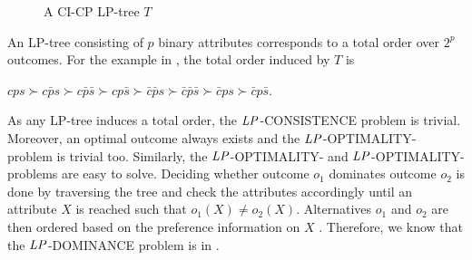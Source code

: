 \begin{figure}
   \small
	\centering

  
  \caption{A CI-CP LP-tree $T$}
  \label{fig:LPTree}
\end{figure}

An LP-tree consisting of $p$ binary attributes corresponds to a total order over
$2^p$ outcomes.  For the example in , the total order induced
by $T$ is
\begin{center}
	$cps \succ c\bar{p}s \succ c\bar{p}\bar{s} \succ cp\bar{s} 
		\succ \bar{c}\bar{p}s \succ \bar{c}\bar{p}\bar{s} \succ \bar{c}ps \succ \bar{c}p\bar{s}$.
\end{center}

As any LP-tree induces a total order, the $\mathit{LP}$-CONSISTENCE problem is trivial.
Moreover, an optimal outcome always exists and the $\mathit{LP}$-OPTIMALITY- problem
is trivial too.  Similarly, the $\mathit{LP}$-OPTIMALITY- and
$\mathit{LP}$-OPTIMALITY- problems are easy to solve.
Deciding whether outcome $o_1$ dominates outcome $o_2$ is done by traversing the tree
and check the attributes accordingly until an attribute $X$ is reached such that
$o_1(X) \not = o_2(X)$.  Alternatives $o_1$ and $o_2$ are then ordered based on the preference
information on $X$ \cite{booth:learningLP}.
Therefore, we know that the $\mathit{LP}$-DOMINANCE problem is in \bP.

